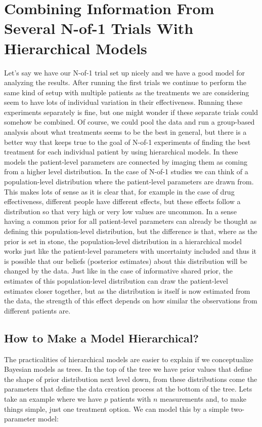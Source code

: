 \documentclass[12pt,a4paper,leqno]{report}
\theoremstyle{plain}
\theoremstyle{definition}
\theoremstyle{remark}
\begin{document}
\chapter{Combining Information From Several N-of-1 Trials With Hierarchical Models}\label{hierarchicalbayes}

Let's say we have our N-of-1 trial set up nicely and we have a good model for analyzing the
results. After running the first trials we continue to perform the same kind of setup
with multiple patients as the treatments we are considering seem to have lots of
individual variation in their effectiveness. Running these experiments separately is
fine, but one might wonder if these separate trials could somehow be combined. Of
course, we could pool the data and run a group-based
analysis about what treatments seems to be the best in general, but there is a better
way that keeps true to the goal of N-of-1 experiments of finding the best treatment for
each individual patient by using hierarchical models. In these models the
patient-level parameters are connected by imaging them as coming from a higher level
distribution. In the case of N-of-1 studies we can think of a population-level distribution
where the patient-level parameters are drawn from. This makes lots of sense as it is
clear that, for example in the case of drug effectiveness, different people have different
effects, but these effects follow a distribution so that very high or very low values are
uncommon. In a sense having a common prior for
all patient-level parameters can already be thought as defining this population-level
distribution, but the difference is that, where as the prior
is set in stone, the population-level
distribution in a hierarchical model works just like the patient-level
parameters with uncertainty included and thus it is possible that our beliefs (posterior
estimates) about this distribution will be changed by the data. Just like in the case of
informative shared prior,
the estimates of this population-level distribution can draw the
patient-level estimates closer together, but as the distribution is itself is now
estimated from the data, the strength of this effect depends on how similar the
observations from different patients are.

\section{How to Make a Model Hierarchical?}

The practicalities of hierarchical models are easier to explain if we conceptualize
Bayesian
models as trees. In the top of the tree we have prior values that define the shape of
prior distribution next level down, from these distributions come the parameters that
define the data creation process at the bottom of the tree. Lets take an example
where we have \(p\) patients with \(n\) measurements and, to make things simple, just
one treatment option. We can model this by a simple two-parameter model:
\end{document}
